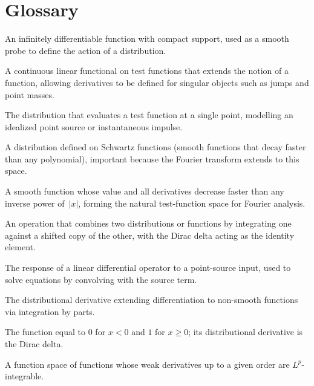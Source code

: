 \theoryapplications
{}
\section*{Glossary}
\begin{description}[leftmargin=*,style=nextline,itemsep=0.3em]
\item[\textbf{Test function.}] An infinitely differentiable function with compact support, used as a smooth probe to define the action of a distribution.
\item[\textbf{Distribution.}] A continuous linear functional on test functions that extends the notion of a function, allowing derivatives to be defined for singular objects such as jumps and point masses.
\item[\textbf{Dirac delta.}] The distribution that evaluates a test function at a single point, modelling an idealized point source or instantaneous impulse.
\item[\textbf{Tempered distribution.}] A distribution defined on Schwartz functions (smooth functions that decay faster than any polynomial), important because the Fourier transform extends to this space.
\item[\textbf{Schwartz function.}] A smooth function whose value and all derivatives decrease faster than any inverse power of~$|x|$, forming the natural test-function space for Fourier analysis.
\item[\textbf{Convolution.}] An operation that combines two distributions or functions by integrating one against a shifted copy of the other, with the Dirac delta acting as the identity element.
\item[\textbf{Green function.}] The response of a linear differential operator to a point-source input, used to solve equations by convolving with the source term.
\item[\textbf{Weak derivative.}] The distributional derivative extending differentiation to non-smooth functions via integration by parts.
\item[\textbf{Heaviside step function.}] The function equal to $0$ for $x<0$ and $1$ for $x\geq 0$; its distributional derivative is the Dirac delta.
\item[\textbf{Sobolev space.}] A function space of functions whose weak derivatives up to a given order are $L^p$-integrable.
\end{description}

